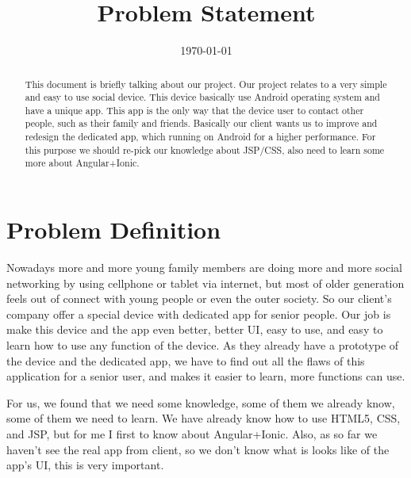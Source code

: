 \documentclass[draftclsnofoot,onecolumn,letterpaper,10pt,cmcc]{IEEEtran}
\title{Problem Statement}
\date{\today}
\author{
    \IEEEauthorblockN{Haolin Han (hanhaol)}
    \IEEEauthorblockA{\\CS 461 | CS Senior Capstone \\ Fall 2017}
    \IEEEauthorblockN{\\10/9/2017}
}
\begin{document}
\maketitle
\begin{abstract}
  This document is briefly talking about our project. Our project relates to a very simple and easy to use social device. This device basically use Android operating system and have a unique app. This app is the only way that the device user to contact other people, such as their family and friends. Basically our client wants us to improve and redesign the dedicated app, which running on Android for a higher performance. For this purpose we should re-pick our knowledge about JSP/CSS, also need to learn some more about Angular+Ionic.
\end{abstract}
\clearpage


\newpage

\section{Problem Definition}
Nowadays more and more young family members are doing more and more social networking by using cellphone or tablet via internet, but most of older generation feels out of connect with young people or even the outer society. So our client's company offer a special device with dedicated app for senior people. Our job is make this device and the app even better, better UI, easy to use, and easy to learn how to use any function of the device. As they already have a prototype of the device and the dedicated app, we have to find out all the flaws of this application for a senior user, and makes it easier to learn, more functions can use.
\par For us, we found that we need some knowledge, some of them we already know, some of them we need to learn. We have already know how to use HTML5, CSS, and JSP, but for me I first to know about Angular+Ionic. Also, as so far we haven't see the real app from client, so we don't know what is looks like of the app's UI, this is very important.
\end{document}
